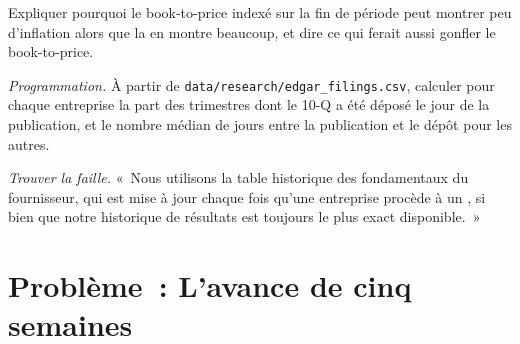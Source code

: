 \begin{exercise}[$\star\star$]\label{exo:rs:fundamental-analyst-and-event-features:6}
Expliquer pourquoi le book-to-price indexé sur la fin de période peut montrer peu d'inflation alors que la  en montre beaucoup,
et dire ce qui ferait aussi gonfler le book-to-price.
\end{exercise}

\begin{exercise}[$\star\star\star$]\label{exo:rs:fundamental-analyst-and-event-features:7}
\emph{Programmation.} À partir de \texttt{data/research/edgar\_filings.csv}, calculer pour chaque entreprise la part des trimestres dont le 10-Q a été déposé le
jour de la publication, et le nombre médian de jours entre la publication et le dépôt pour les autres.
\end{exercise}

\begin{exercise}[$\star\star\star$]\label{exo:rs:fundamental-analyst-and-event-features:8}
\emph{Trouver la faille.} «~Nous utilisons la table historique des fondamentaux du fournisseur, qui est mise à jour chaque fois qu'une entreprise procède à un , si bien que notre historique de résultats
est toujours le plus exact disponible.~»
\end{exercise}

\section{Problème~: L'avance de cinq semaines}

